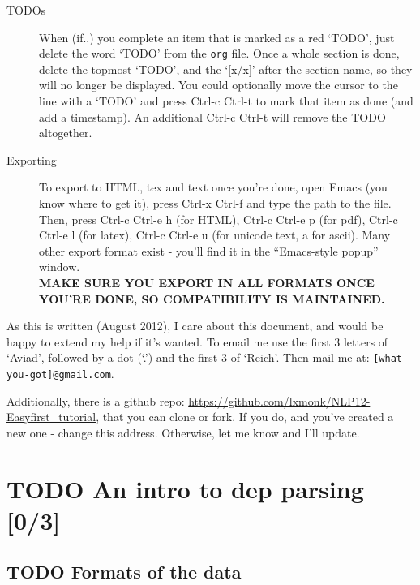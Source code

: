 \documentclass[11pt]{article}
\begin{document}
\begin{description}
\item[TODOs] When (if..) you complete an item that is marked as a red
             `TODO', just delete the word `TODO' from the \texttt{org}
             file. Once a whole section is done, delete the topmost
             `TODO', and the `[x/x]' after the section name, so they will
             no longer be displayed. You could optionally move the cursor
             to the line with a `TODO' and press Ctrl-c Ctrl-t to mark
             that item as done (and add a timestamp).  An additional
             Ctrl-c Ctrl-t will remove the TODO altogether.
\end{description}


\begin{description}
\item[Exporting] To export to HTML, tex and text once you're done, open
             Emacs (you  know where to get it), press Ctrl-x Ctrl-f
             and type the path to the file. Then, press Ctrl-c
             Ctrl-e h (for HTML), Ctrl-c Ctrl-e p (for pdf), Ctrl-c
             Ctrl-e l (for latex), Ctrl-c Ctrl-e u (for unicode
             text, a for ascii). Many other export format exist -
             you'll find it in the ``Emacs-style popup''
             window. \\
             \textbf{MAKE SURE YOU EXPORT IN ALL FORMATS ONCE YOU'RE              DONE, SO COMPATIBILITY IS MAINTAINED.}
\end{description}

As this is written (August 2012), I care about this document, and
would be happy to extend my help if it's wanted. To email me use the
first 3 letters of `Aviad', followed by a dot (`.') and the
first 3 of `Reich'. Then mail me at: \texttt{[what-you-got]@gmail.com}.

Additionally, there is a github repo:
\href{https://github.com/lxmonk/NLP12-Easyfirst_tutorial}{https://github.com/lxmonk/NLP12-Easyfirst\_tutorial}, that you can clone
or fork. If you do, and you've created a new one - change this
address. Otherwise, let me know and I'll update.
\section{\textbf{TODO} An intro to dep parsing [0/3]}
\label{sec-2}
\subsection{\textbf{TODO} Formats of the data}
\label{sec-2-1}
\end{document}
